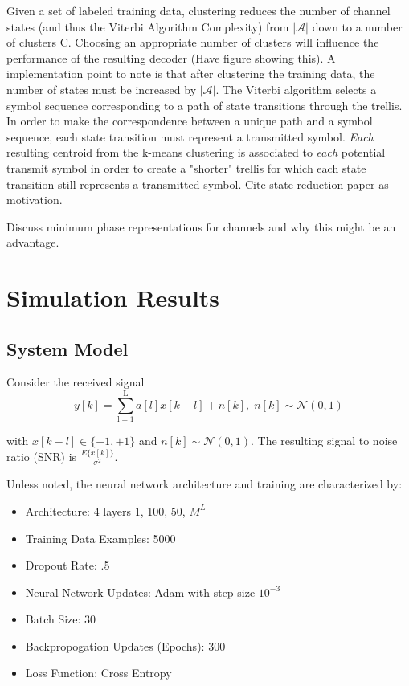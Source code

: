 \documentclass[12pt,a4paper]{report}
\begin{document}
Given a set of labeled training data, clustering reduces the number of channel states (and thus the Viterbi Algorithm Complexity) from $|\mathcal{A}|$ down to a number of clusters C. Choosing an appropriate number of clusters will influence the performance of the resulting decoder (Have figure showing this).
A implementation point to note is that after clustering the training data, the number of states must be increased by $|\mathcal{A}|$. The Viterbi algorithm selects a symbol sequence corresponding to a path of state transitions through the trellis. In order to make the correspondence between a unique path and a symbol sequence, each state transition must represent a transmitted symbol. \emph{Each} resulting centroid from the k-means clustering is associated to \emph{each} potential transmit symbol in order to create a "shorter" trellis for which each state transition still represents a transmitted symbol. 
Cite state reduction paper as motivation. 

Discuss minimum phase representations for channels and why this might be an advantage. 



\section{Simulation Results}
\subsection{System Model}
Consider the received signal 
\begin{equation}
y[k] = \sum_{\mathrm{l=1}}^{\mathrm{L}} a[l]x[k-l] + n[k], \; n[k]  \sim \mathcal{N}(0,1)
\end{equation}

with $x[k-l] \in \{ -1, +1\}$ and $n[k]  \sim \mathcal{N}(0,1)$.  
The resulting signal to noise ratio (SNR) is 
$\frac{E\{x[k]\}}{\sigma^2}$.

Unless noted, the neural network architecture and training are characterized by:
\begin{itemize}
\item Architecture: 4 layers {1, 100, 50, $M^L$}
\item Training Data Examples: 5000
\item Dropout Rate: .5
\item Neural Network Updates: Adam with step size $10^{-3}$ \cite{kingma2014adam}
\item Batch Size: 30 
\item Backpropogation Updates (Epochs): 300
\item Loss Function: Cross Entropy
\end{itemize}
\end{document}
